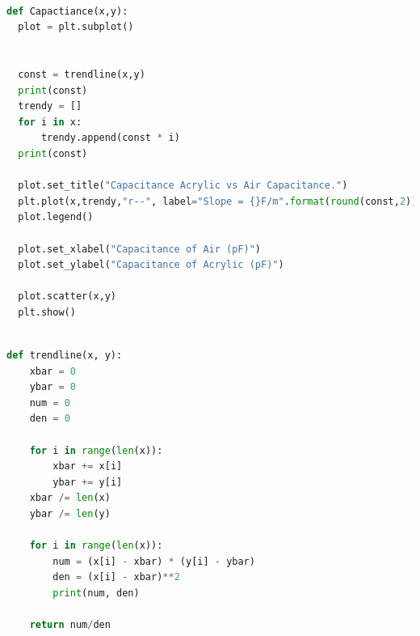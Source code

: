 \documentclass[10pt]{article}
\begin{document}
\begin{lstlisting}[language=Python, caption={Python code for generating Capacitance of air vs Acrylic}]

def Capactiance(x,y):
  plot = plt.subplot()


  const = trendline(x,y)
  print(const)
  trendy = []
  for i in x:
      trendy.append(const * i)
  print(const)

  plot.set_title("Capacitance Acrylic vs Air Capacitance.")
  plt.plot(x,trendy,"r--", label="Slope = {}F/m".format(round(const,2)))
  plot.legend()

  plot.set_xlabel("Capacitance of Air (pF)")
  plot.set_ylabel("Capacitance of Acrylic (pF)")

  plot.scatter(x,y)
  plt.show()  

  \end{lstlisting}

\begin{lstlisting}[language=Python, caption={Python code for generating the slope of the trend line}]

def trendline(x, y):
    xbar = 0
    ybar = 0
    num = 0
    den = 0

    for i in range(len(x)):
        xbar += x[i]
        ybar += y[i]
    xbar /= len(x)
    ybar /= len(y)

    for i in range(len(x)):
        num = (x[i] - xbar) * (y[i] - ybar)
        den = (x[i] - xbar)**2
        print(num, den)

    return num/den

  \end{lstlisting}


\end{document}
